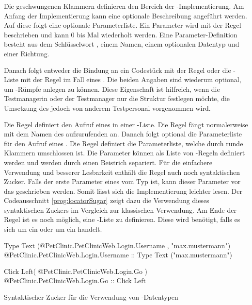 \SuperPar
Die geschwungenen Klammern definieren den Bereich der -Implementierung. Am Anfang der Implementierung kann eine optionale Beschreibung angeführt werden. Auf diese folgt eine optionale Parameterliste. Ein Parameter wird mit der Regel  beschrieben und kann 0 bis  Mal wiederholt werden. Eine Parameter-Definition besteht aus dem Schlüsselwort , einem Namen, einem optionalen Datentyp und einer Richtung.

\SuperPar
Danach folgt entweder die Bindung an ein Codestück mit der Regel  oder die -Liste mit der Regel  im Fall eines . Die beiden Angaben sind wiederum optional, um -Rümpfe anlegen zu können. Diese Eigenschaft ist hilfreich, wenn die Testmanagerin oder der Testmanager nur die Struktur festlegen möchte, die Umsetzung des  jedoch von anderem Testpersonal vorgenommen wird. 

\SuperPar
Die Regel  definiert den Aufruf eines  in einer -Liste. Die Regel fängt normalerweise mit dem Namen des aufzurufenden  an. Danach folgt optional die Parameterliste für den Aufruf eines . Die Regel  definiert die Parameterliste, welche durch runde Klammern umschlossen ist. Die Parameter können als Liste von -Regeln definiert werden und werden durch einen Beistrich separiert. Für die einfachere Verwendung und besserer Lesbarkeit enthält die Regel  auch noch syntaktischen Zucker. Falls der erste Parameter eines  vom Typ  ist, kann dieser Parameter vor das  geschrieben werden. Somit lässt sich die Implementierung leichter lesen. Der Codeausschnitt \ref{prog:locatorSugar} zeigt dazu die Verwendung dieses syntaktischen Zuckers im Vergleich zur klassischen Verwendung. Am Ende der -Regel ist es noch möglich, eine -Liste zu definieren. Diese wird benötigt, falls es sich um ein  oder um ein  handelt.

\begin{program}
\begin{JavaCode}
  Type Text (@PetClinic.PetClinicWeb.Login.Username , "max.mustermann")
	@PetClinic.PetClinicWeb.Login.Username :: Type Text ("max.mustermann")
	
	
	Click Left( @PetClinic.PetClinicWeb.Login.Go )
  @PetClinic.PetClinicWeb.Login.Go :: Click Left
\end{JavaCode}
\caption{Syntaktischer Zucker für die Verwendung von -Datentypen}
\label{prog:locatorSugar}
\end{program}


